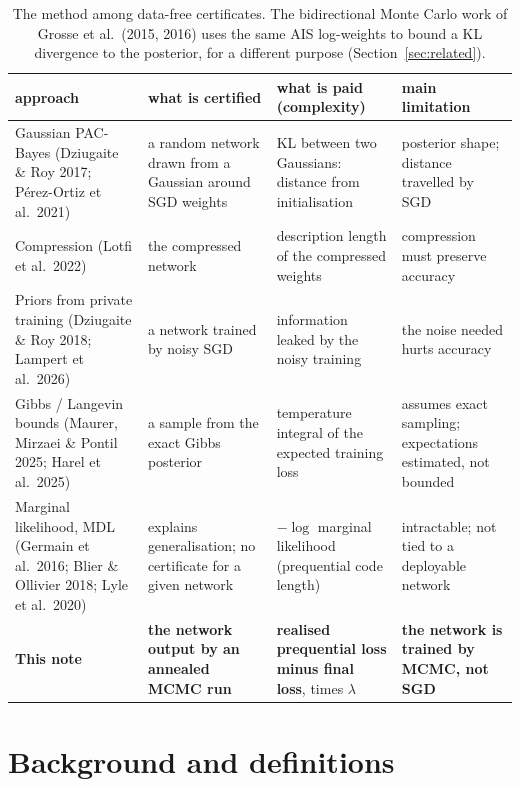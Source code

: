 \documentclass[11pt]{article}
\theoremstyle{definition}
\theoremstyle{remark}
\begin{document}
\begin{table}[t]
\centering\small
\renewcommand{\arraystretch}{1.25}
\begin{tabular}{@{}p{3.5cm}p{3.3cm}p{3.9cm}p{4.0cm}@{}}
\toprule
approach & what is certified & what is paid (complexity) & main limitation\\
\midrule
Gaussian PAC-Bayes (Dziugaite \& Roy 2017; P\'erez-Ortiz et al.\ 2021) & a random network drawn from a Gaussian around SGD weights & KL between two Gaussians: distance from initialisation & posterior shape; distance travelled by SGD\\
Compression (Lotfi et al.\ 2022) & the compressed network & description length of the compressed weights & compression must preserve accuracy\\
Priors from private training (Dziugaite \& Roy 2018; Lampert et al.\ 2026) & a network trained by noisy SGD & information leaked by the noisy training & the noise needed hurts accuracy\\
Gibbs / Langevin bounds (Maurer, Mirzaei \& Pontil 2025; Harel et al.\ 2025) & a sample from the exact Gibbs posterior & temperature integral of the expected training loss & assumes exact sampling; expectations estimated, not bounded\\
Marginal likelihood, MDL (Germain et al.\ 2016; Blier \& Ollivier 2018; Lyle et al.\ 2020) & explains generalisation; no certificate for a given network & $-\log$ marginal likelihood (prequential code length) & intractable; not tied to a deployable network\\
\textbf{This note} & \textbf{the network output by an annealed MCMC run} & \textbf{realised prequential loss minus final loss}, times $\lambda$ & \textbf{the network is trained by MCMC, not SGD}\\
\bottomrule
\end{tabular}
\caption{The method among data-free certificates. The bidirectional Monte Carlo work of Grosse et al.\ (2015, 2016) uses
the same AIS log-weights to bound a KL divergence to the posterior, for a different purpose (Section~\ref{sec:related}).}\label{tab:glance}
\end{table}

\section{Background and definitions}\label{sec:background}
\end{document}
